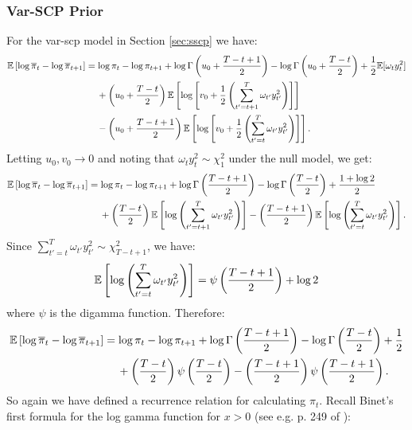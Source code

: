 \subsubsection{Var-SCP Prior}

For the var-scp model in Section \ref{sec:sscp} we have:
\small
\begin{align*}
    \mathbb{E}\left[\log\overline{\pi}_t - \log \overline{\pi}_{t+1} \right] &= \log \pi_t- \log \pi_{t+1} +\log \Gamma\left(u_0 +\frac{ T-t+1}{2}\right) - \log \Gamma\left(u_0 +\frac{ T-t}{2}\right) + \frac{1}{2} \mathbb{E}[\omega_ty_t^2] \\
    &\quad \: + \left(u_0 + \frac{T - t}{2}\right)\mathbb{E}\left[\log\left[v_0 +\frac{1}{2}\left(\sum_{t'=t+1}^T \omega_{t'}y_{t'}^2\right)\right]\right] \\
     &\quad \:- \left(u_0 + \frac{T - t +1}{2}\right)\mathbb{E}\left[\log\left[v_0 +\frac{1}{2}\left(\sum_{t'=t}^T \omega_{t'}y_{t'}^2\right)\right]\right].
\end{align*}
\normalsize
Letting $u_0,v_0 \to 0$ and noting that $\omega_{t}y^2_{t} \sim \chi^2_1$ under the null model, we get:
\small
\begin{align*}
    \mathbb{E}\left[\log\overline{\pi}_t - \log \overline{\pi}_{t+1} \right] &= \log \pi_t- \log \pi_{t+1} +\log \Gamma\left(\frac{T-t+1}{2}\right) - \log \Gamma\left(\frac{T-t}{2}\right) + \frac{1 + \log 2}{2}\\
    &\quad \: + \left(\frac{T - t}{2}\right)\mathbb{E}\left[\log\left(\sum_{t'=t+1}^T \omega_{t'}y_{t'}^2\right)\right] - \left(\frac{T - t +1}{2}\right)\mathbb{E}\left[\log\left(\sum_{t'=t}^T \omega_{t'}y_{t'}^2\right)\right].
\end{align*}
\normalsize
Since $\sum_{t'=t}^T \omega_{t'}y_{t'}^2 \sim \chi^2_{T-t+1}$, we have:
\begin{align*}
    \mathbb{E}\left[\log\left(\sum_{t'=t}^T \omega_{t'}y_{t'}^2\right)\right] = \psi\left(\frac{T-t+1}{2}\right) + \log 2
\end{align*}
where $\psi$ is the digamma function. Therefore:
\begin{align*}
    \mathbb{E}\left[\log\overline{\pi}_t - \log \overline{\pi}_{t+1} \right] &= \log \pi_t- \log \pi_{t+1} +\log \Gamma\left(\frac{T-t+1}{2}\right) - \log \Gamma\left(\frac{T-t}{2}\right) + \frac{1}{2}\\
    &\quad \: + \left(\frac{T - t}{2}\right)\psi\left(\frac{T-t}{2}\right)  - \left(\frac{T - t +1}{2}\right)\psi\left(\frac{T-t+1}{2}\right).
\end{align*}
So again we have defined a recurrence relation for calculating $\pi_t$. Recall Binet's first formula for the log gamma function for $x > 0$ (see e.g. p. 249 of \citealp{Whittaker96}): 
